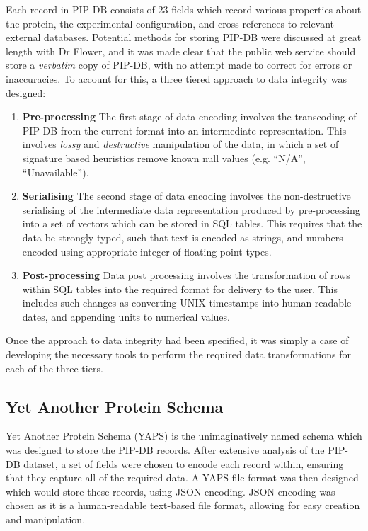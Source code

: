Each record in PIP-DB consists of 23 fields which record various
properties about the protein, the experimental configuration, and
cross-references to relevant external databases. Potential methods for
storing PIP-DB were discussed at great length with Dr Flower, and it
was made clear that the public web service should store a
\textit{verbatim} copy of PIP-DB, with no attempt made to correct for
errors or inaccuracies. To account for this, a three tiered approach
to data integrity was designed:

\begin{enumerate}
\item \textbf{Pre-processing} The first stage of data encoding
  involves the transcoding of PIP-DB from the current format into an
  intermediate representation. This involves \textit{lossy} and
  \textit{destructive} manipulation of the data, in which a set of
  signature based heuristics remove known null values (e.g. ``N/A'',
  ``Unavailable'').
\item \textbf{Serialising} The second stage of data encoding involves
  the non-destructive serialising of the intermediate data
  representation produced by pre-processing into a set of vectors
  which can be stored in SQL tables. This requires that the data be
  strongly typed, such that text is encoded as strings, and numbers
  encoded using appropriate integer of floating point types.
\item \textbf{Post-processing} Data post processing involves the
  transformation of rows within SQL tables into the required format
  for delivery to the user. This includes such changes as converting
  UNIX timestamps into human-readable dates, and appending units to
  numerical values.
\end{enumerate}

Once the approach to data integrity had been specified, it was simply
a case of developing the necessary tools to perform the required data
transformations for each of the three tiers.

\subsection{Yet Another Protein Schema}\label{subsec:yaps}

Yet Another Protein Schema (YAPS) is the unimaginatively named schema
which was designed to store the PIP-DB records. After extensive
analysis of the PIP-DB dataset, a set of fields were chosen to encode
each record within, ensuring that they capture all of the required
data. A YAPS file format was then designed which would store these
records, using JSON encoding. JSON encoding was chosen as it is a
human-readable text-based file format, allowing for easy creation and
manipulation.


